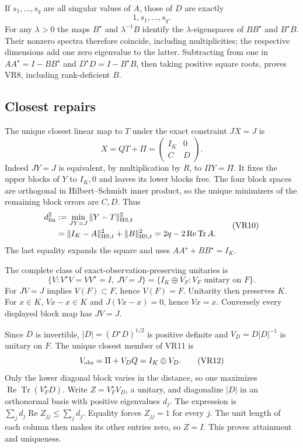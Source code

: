 If \(s_1,\ldots,s_q\) are all singular values of \(A\), those of \(D\) are exactly
\[
 1,s_1,\ldots,s_q. \tag{VR8}
\]
For any \(\lambda>0\) the maps \(B^\star\) and \(\lambda^{-1}B\) identify the \(\lambda\)-eigenspaces of \(BB^\star\) and \(B^\star B\). Their nonzero spectra therefore coincide, including multiplicities; the respective dimensions add one zero eigenvalue to the latter. Subtracting from one in
\(AA^\star=I-BB^\star\) and \(D^\star D=I-B^\star B\), then taking positive square roots, proves VR8, including rank-deficient \(B\).

\subsection{Closest repairs}

The unique closest linear map to \(T\) under the exact constraint \(JX=J\) is
\[
 X=QT+\Pi=\begin{pmatrix}I_K&0\\C&D\end{pmatrix}.
 \tag{VR9}
\]
Indeed \(JY=J\) is equivalent, by multiplication by \(R\), to \(\Pi Y=\Pi\). It fixes the upper blocks of \(Y\) to \(I_K,0\) and leaves its lower blocks free. The four block spaces are orthogonal in Hilbert--Schmidt inner product, so the unique minimizers of the remaining block errors are \(C,D\). Thus
\[
 \begin{aligned}
 d_{\rm lin}^2
 &:=\min_{JY=J}\|Y-T\|_{\mathrm{HS},t}^2\\
 &=\|I_K-A\|_{\mathrm{HS},t}^2+\|B\|_{\mathrm{HS},t}^2
 =2q-2\operatorname{Re}\operatorname{Tr}A .
 \end{aligned} \tag{VR10}
\]
The last equality expands the square and uses \(AA^\star+BB^\star=I_K\).

The complete class of exact-observation-preserving unitaries is
\[
 \{V:V^\star V=VV^\star=I,\ JV=J\}
 =\{I_K\oplus V_F:V_F\text{ unitary on }F\}. \tag{VR11}
\]
For \(JV=J\) implies \(V(F)\subset F\), hence \(V(F)=F\). Unitarity then preserves \(K\). For \(x\in K\), \(Vx-x\in K\) and \(J(Vx-x)=0\), hence \(Vx=x\). Conversely every displayed block map has \(JV=J\).

Since \(D\) is invertible, \(|D|=(D^\star D)^{1/2}\) is positive definite and \(V_D=D|D|^{-1}\) is unitary on \(F\). The unique closest member of VR11 is
\[
 V_{\rm obs}=\Pi+V_DQ=I_K\oplus V_D. \tag{VR12}
\]
Only the lower diagonal block varies in the distance, so one maximizes
\(\operatorname{Re}\operatorname{Tr}(V_F^\star D)\). Write \(Z=V_F^\star V_D\), a unitary, and diagonalize \(|D|\) in an orthonormal basis with positive eigenvalues \(d_j\). The expression is \(\sum_jd_j\operatorname{Re}Z_{jj}\le\sum_jd_j\). Equality forces \(Z_{jj}=1\) for every \(j\). The unit length of each column then makes its other entries zero, so \(Z=I\). This proves attainment and uniqueness.

